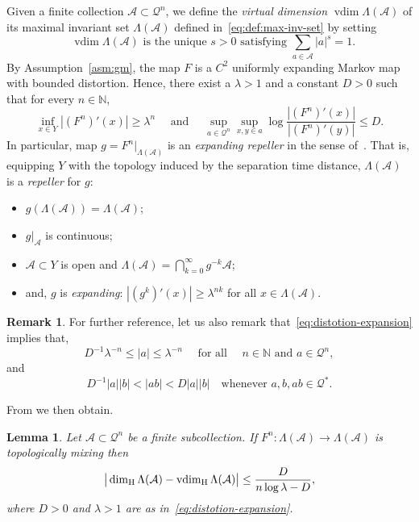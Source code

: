 \documentclass[english, 10pt]{amsart}
\numberwithin{equation}{section}
\theoremstyle{definition}
\theoremstyle{plain}
\newtheorem{lemma}[definition]{Lemma}
\theoremstyle{plain}
\theoremstyle{definition}
\newtheorem{remark}[definition]{Remark}
\theoremstyle{definition}
\theoremstyle{plain}
\theoremstyle{definition}
\newcommand{\vdim}{\operatorname{vdim}}
\newcommand{\cA}{{\mathcal A}}
\newcommand{\cQ}{{\mathcal Q}}
\newcommand{\N}{{\mathbb N}}
\newcommand{\bN}{\N}
\numberwithin{equation}{section}
\begin{document}
Given a finite collection $\cA \subset \cQ^n$, we define the \emph{virtual dimension} $\vdim \Lambda ( \cA ) $ of its maximal invariant set $\Lambda ( \cA )$ defined in~\eqref{eq:def:max-inv-set} by setting
\begin{equation}\label{defvDim}
	\text{ $\vdim\Lambda(\cA)$ is the unique $s > 0$ satisfying $\sum_{a\in\cA}|a|^s = 1$}
  .
\end{equation}
By Assumption~\ref{asm:gm}, the map $F$ is a $C^{ 2 }$ uniformly expanding Markov map with bounded distortion. Hence, there exist a $\lambda > 1$ and a constant $D > 0$ such that for every $n\in\bN$,
\begin{equation}\label{eq:distotion-expansion}
  	\inf_{x\in Y} \left|(F^n)'(x)\right| \ge \lambda^n
	\quad\text{ and }\quad
	\sup_{a\in\cQ^n}\sup_{ x,y\in a } \log \frac{| (F^n)' (x)|}{| (F^n)' (y) |} \le D.
\end{equation}
In particular, map $g = F^n|_{\Lambda (\cA )}$ is an \emph{expanding repeller} in the sense of~\cite{PrzUrb:10}. That is, equipping $Y$ with the topology induced by the separation time distance, $\Lambda (\cA)$ is a \emph{repeller} for $g$:
\begin{itemize}
  \item $g(\Lambda (\cA)) = \Lambda ( \cA )$;
  \item $g|_{\cA}$ is continuous;
  \item $\cA \subset Y$ is open and $\Lambda ( \cA ) = \bigcap_{ k = 0 }^{ \infty } g^{-k} \cA$;
  \item and, $g$ is \emph{expanding}: $|(g^k)'(x)| \ge \lambda^{nk}$ for all $x\in \Lambda ( \cA)$.
\end{itemize}

\begin{remark}\label{rem:dist-exp}
  For further reference, let us also remark that~\eqref{eq:distotion-expansion} implies that,
  \begin{equation}\label{smallLeb}
    D^{-1}\lambda^{-n}
    \le|a|\le \lambda^{-n}
    \quad\text{ for all }\quad n\in \N \text{ and }a\in\cQ^n,
  \end{equation}
  and
  \[
  	D^{-1} |a||b| < |ab| < D |a||b|
    \quad
    \text{whenever $a,b,ab \in \cQ^*$.}
  \]
\end{remark}

From \cite[proof of Theorem 3, Section 4.2]{PalTak:93} we then obtain.


\begin{lemma}\label{lem:approxvdim}
  Let $\cA \subset \cQ^n$ be a finite subcollection. If $F^n\colon \Lambda ( \cA ) \to \Lambda ( \cA )$ is topologically mixing then
  \[
    \big\lvert \dim_{\rm H}\Lambda(\cA)-\vdim_{\rm H}\Lambda(\cA)\big\rvert
    \le \frac{D}{n\log\lambda-D}
    ,
  \]
  where $D > 0$ and $\lambda > 1$ are as in~\eqref{eq:distotion-expansion}.
\end{lemma}
\end{document}
